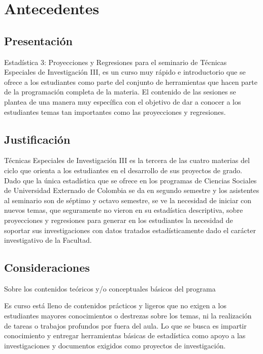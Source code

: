 \documentclass[
  letterpaper,
  DIV=11,
  numbers=noendperiod]{scrreprt}
\begin{document}

\chapter{Antecedentes}\label{antecedentes}

\section{Presentación}\label{presentaciuxf3n}

Estadística 3: Proyecciones y Regresiones para el seminario de Técnicas
Especiales de Investigación III, es un curso muy rápido e introductorio
que se ofrece a los estudiantes como parte del conjunto de herramientas
que hacen parte de la programación completa de la materia. El contenido
de las sesiones se plantea de una manera muy específica con el objetivo
de dar a conocer a los estudiantes temas tan importantes como las
proyecciones y regresiones.

\section{Justificación}\label{justificaciuxf3n}

Técnicas Especiales de Investigación III es la tercera de las cuatro
materias del ciclo que orienta a los estudiantes en el desarrollo de sus
proyectos de grado. Dado que la única estadística que se ofrece en los
programas de Ciencias Sociales de Universidad Externado de Colombia se
da en segundo semestre y los asistentes al seminario son de séptimo y
octavo semestre, se ve la necesidad de iniciar con nuevos temas, que
seguramente no vieron en su estadística descriptiva, sobre proyecciones
y regresiones para generar en los estudiantes la necesidad de soportar
sus investigaciones con datos tratados estadísticamente dado el carácter
investigativo de la Facultad.

\section{Consideraciones}\label{consideraciones}

Sobre los contenidos teóricos y/o conceptuales básicos del programa

Es curso está lleno de contenidos prácticos y ligeros que no exigen a
los estudiantes mayores conocimientos o destrezas sobre los temas, ni la
realización de tareas o trabajos profundos por fuera del aula. Lo que se
busca es impartir conocimiento y entregar herramientas básicas de
estadística como apoyo a las investigaciones y documentos exigidos como
proyectos de investigación.
\end{document}
